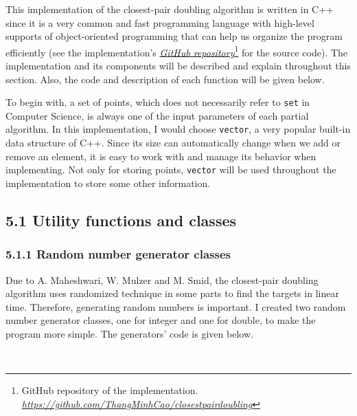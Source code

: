 \documentclass[12pt,english,]{article}
\newcommand{\code}[1]{\colorbox{light-gray}{\texttt{#1}}}
\begin{document}
This implementation of the closest-pair doubling algorithm is written in
C++ since it is a very common and fast programming language with
high-level supports of object-oriented programming that can help us
organize the program efficiently (see the implementation's
\href{https://github.com/ThangMinhCao/closestpairdoubling}{\emph{GitHub
repository}}\footnote{GitHub repository of the implementation.
  \href{https://github.com/ThangMinhCao/closestpairdoubling}{\emph{https://github.com/ThangMinhCao/closestpairdoubling}}}
for the source code). The implementation and its components will be
described and explain throughout this section. Also, the code and
description of each function will be given below.

To begin with, a set of points, which does not necessarily refer to
\code{set} in Computer Science, is always one of the input parameters of
each partial algorithm. In this implementation, I would choose
\code{vector}, a very popular built-in data structure of C++. Since its
size can automatically change when we add or remove an element, it is
easy to work with and manage its behavior when implementing. Not only
for storing points, \code{vector} will be used throughout the
implementation to store some other information.

\hypertarget{section5.1}{%
\subsection{5.1 Utility functions and classes}\label{section5.1}}

\hypertarget{section5.1.1}{%
\subsubsection{5.1.1 Random number generator
classes}\label{section5.1.1}}

Due to A. Maheshwari, W. Mulzer and M. Smid, the closest-pair doubling
algorithm uses randomized technique in some parts to find the targets in
linear time. Therefore, generating random numbers is important. I
created two random number generator classes, one for integer and one for
double, to make the program more simple. The generators' code is given
below.

~
\end{document}
